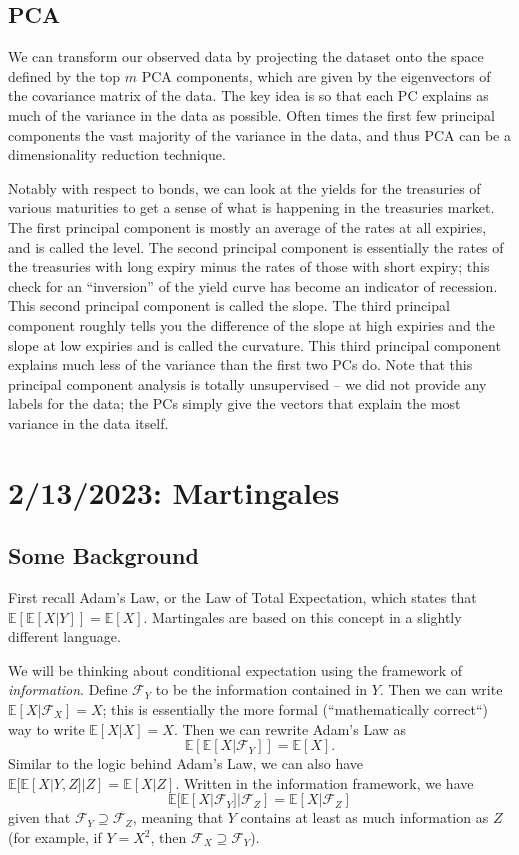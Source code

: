 \documentclass[12pt]{report}
\begin{document}
\section{PCA}
We can transform our observed data by projecting the dataset onto the space defined by the top $m$ PCA components, which are given by the eigenvectors of the covariance matrix of the data. The key idea is so that each PC explains as much of the variance in the data as possible. Often times the first few principal components the vast majority of the variance in the data, and thus PCA can be a dimensionality reduction technique.

Notably with respect to bonds, we can look at the yields for the treasuries of various maturities to get a sense of what is happening in the treasuries market. The first principal component is mostly an average of the rates at all expiries, and is called the level. The second principal component is essentially the rates of the treasuries with long expiry minus the rates of those with short expiry; this check for an ``inversion'' of the yield curve has become an indicator of recession. This second principal component is called the slope. The third principal component roughly tells you the difference of the slope at high expiries and the slope at low expiries and is called the curvature. This third principal component explains much less of the variance than the first two PCs do. Note that this principal component analysis is totally unsupervised -- we did not provide any labels for the data; the PCs simply give the vectors that explain the most variance in the data itself.

\chapter{2/13/2023: Martingales}
\section{Some Background}
First recall Adam's Law, or the Law of Total Expectation, which states that $\mathbb E[\mathbb E[X|Y]] = \mathbb E[X]$. Martingales are based on this concept in a slightly different language.

We will be thinking about conditional expectation using the framework of \textit{information}. Define $\mathcal F_Y$ to be the information contained in $Y$. Then we can write $\mathbb E[X|\mathcal F_X] = X$; this is essentially the more formal (``mathematically correct``) way to write $\mathbb E[X|X] = X$. Then we can rewrite Adam's Law as $$ \mathbb E[\mathbb E[X|\mathcal F_Y]] = \mathbb E[X]. $$ Similar to the logic behind Adam's Law, we can also have $\mathbb E[\mathbb E[X|Y,Z]|Z] = \mathbb E[X|Z]$. Written in the information framework, we have $$\mathbb E[\mathbb E[X|\mathcal F_Y]|\mathcal F_Z]=\mathbb E[X|\mathcal F_Z]$$ given that $\mathcal F_Y\supseteq\mathcal F_Z$, meaning that $Y$ contains at least as much information as $Z$ (for example, if $Y=X^2$, then $\mathcal F_X\supseteq\mathcal F_Y$).
\end{document}
